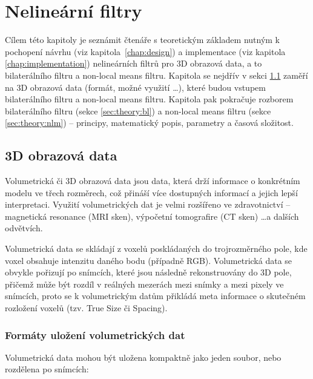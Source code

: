 \chapter{Nelineární filtry}
\label{chap:theory}
Cílem této kapitoly je seznámit čtenáře s teoretickým základem nutným k pochopení návrhu (viz kapitola~\ref{chap:design}) a implementace (viz kapitola \ref{chap:implementation}) nelineárních filtrů pro 3D obrazová data, a to bilaterálního filtru a non-local means filtru. Kapitola se nejdřív v sekci \ref{sec:theory:volumetric_data} zaměří na 3D 
obrazová data (formát, možné využití \dots), které budou vstupem bilaterálního filtru a non-local means filtru. Kapitola pak pokračuje rozborem bilaterálního filtru (sekce \ref{sec:theory:bl}) a non-local means filtru (sekce \ref{sec:theory:nlm}) -- principy, matematický popis, parametry a časová složitost.

\section{3D obrazová data}
\label{sec:theory:volumetric_data}
Volumetrická či 3D obrazová data jsou data, která drží informace o konkrétním modelu ve třech rozměrech, což přináší více dostupných informací a jejich lepší interpretaci. Využití volumetrických dat je velmi rozšířeno ve zdravotnictví -- magnetická resonance (MRI sken), výpočetní tomografire (CT sken) \dots a dalších odvětvích.

Volumetrická data se skládají z voxelů poskládaných do trojrozměrného pole, kde voxel obsahuje intenzitu daného bodu (případně RGB). Volumetrická data se obvykle pořizují po snímcích, které jsou následně rekonstruovány do 3D pole, přičemž může být rozdíl v reálných mezerách mezi snímky a mezi pixely ve snímcích, proto se k volumetrickým datům přikládá meta informace o skutečném rozložení voxelů (tzv. True Size či Spacing).

\subsection*{Formáty uložení volumetrických dat}
Volumetrická data mohou být uložena kompaktně jako jeden soubor, nebo rozdělena po snímcích:

